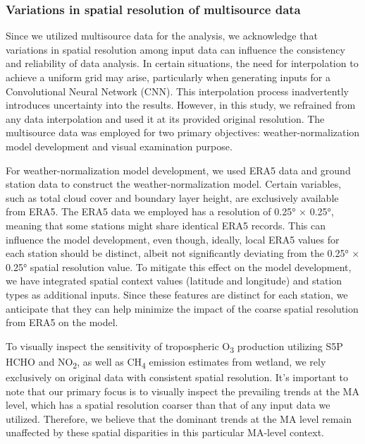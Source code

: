 \subsubsection*{Variations in spatial resolution of multisource data}
Since we utilized multisource data for the analysis, we acknowledge that variations in spatial resolution among input data can influence the consistency and reliability of data analysis. In certain situations, the need for interpolation to achieve a uniform grid may arise, particularly when generating inputs for a Convolutional Neural Network (CNN). This interpolation process inadvertently introduces uncertainty into the results.  However, in this study, we refrained from any data interpolation and used it at its provided original resolution. The multisource data was employed for two primary objectives: weather-normalization model development and visual examination purpose. \par
For weather-normalization model development, we used ERA5 data and ground station data to construct the weather-normalization model. Certain variables, such as total cloud cover and boundary layer height, are exclusively available from ERA5. The ERA5 data we employed has a resolution of 0.25° × 0.25°, meaning that some stations might share identical ERA5 records. This can influence the model development, even though, ideally, local ERA5 values for each station should be distinct, albeit not significantly deviating from the 0.25° × 0.25° spatial resolution value. To mitigate this effect on the model development, we have integrated spatial context values (latitude and longitude) and station types as additional inputs. Since these features are distinct for each station, we anticipate that they can help minimize the impact of the coarse spatial resolution from ERA5 on the model. \par
To visually inspect the sensitivity of tropospheric O\textsubscript{3} production utilizing S5P HCHO and NO\textsubscript{2}, as well as CH\textsubscript{4} emission estimates from wetland, we rely exclusively on original data with consistent spatial resolution. It's important to note that our primary focus is to visually inspect the prevailing trends at the MA level, which has a spatial resolution coarser than that of any input data we utilized. Therefore, we believe that the dominant trends at the MA level remain unaffected by these spatial disparities in this particular MA-level context. \par

